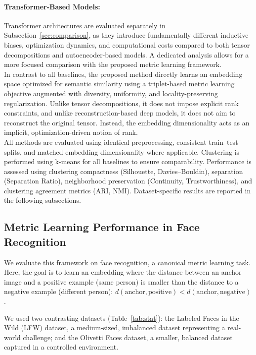 \documentclass[a4paper,12pt,reqno]{amsart}
\theoremstyle{definition}
\theoremstyle{remark}
\begin{document}
	\paragraph{Transformer-Based Models:}
	Transformer architectures are evaluated separately in Subsection~\ref{sec:comparison}, as they introduce fundamentally different inductive biases, optimization dynamics, and computational costs compared to both tensor decompositions and autoencoder-based models. A dedicated analysis allows for a more focused comparison with the proposed metric learning framework.\\
	In contrast to all baselines, the proposed method directly learns an embedding space optimized for semantic similarity using a triplet-based metric learning objective augmented with diversity, uniformity, and locality-preserving regularization. Unlike tensor decompositions, it does not impose explicit rank constraints, and unlike reconstruction-based deep models, it does not aim to reconstruct the original tensor. Instead, the embedding dimensionality acts as an implicit, optimization-driven notion of rank.\\
	All methods are evaluated using identical preprocessing, consistent train--test splits, and matched embedding dimensionality where applicable. Clustering is performed using k-means for all baselines to ensure comparability. Performance is assessed using clustering compactness (Silhouette, Davies--Bouldin), separation (Separation Ratio), neighborhood preservation (Continuity, Trustworthiness), and clustering agreement metrics (ARI, NMI). Dataset-specific results are reported in the following subsections.






\subsection{Metric Learning Performance in Face Recognition}

We evaluate this framework on face recognition, a canonical metric learning task. Here, the goal is to learn an embedding where the distance between an anchor image and a positive example (same person) is smaller than the distance to a negative example (different person): \(d(\text{anchor}, \text{positive}) < d(\text{anchor}, \text{negative})\).

We used two contrasting datasets (Table~\ref{tab:stat}): the {Labeled Faces in the Wild (LFW)} \cite{huang2008labeled} dataset, a medium-sized, imbalanced dataset representing a real-world challenge; and the {Olivetti Faces} \cite{pedregosa2011scikit} dataset, a smaller, balanced dataset captured in a controlled environment.
\end{document}
